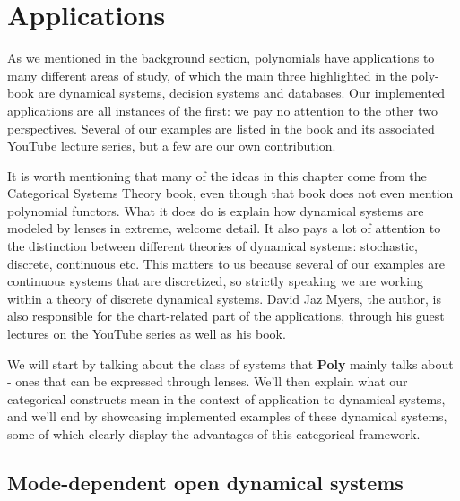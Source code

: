 \chapter{Applications}
\label{chapter:application}
As we mentioned in the background section, polynomials have applications to many different areas of study, of which the main three highlighted in the poly-book are dynamical systems, decision systems and databases. Our implemented applications are all instances of the first: we pay no attention to the other two perspectives. Several of our examples are listed in the book and its associated YouTube lecture series, but a few are our own contribution.

It is worth mentioning that many of the ideas in this chapter come from the Categorical Systems Theory book, even though that book does not even mention polynomial functors. What it does do is explain how dynamical systems are modeled by lenses in extreme, welcome detail. It also pays a lot of attention to the distinction between different theories of dynamical systems: stochastic, discrete, continuous etc. This matters to us because several of our examples are continuous systems that are discretized, so strictly speaking we are working within a theory of discrete dynamical systems. David Jaz Myers, the author, is also responsible for the chart-related part of the applications, through his guest lectures on the YouTube series as well as his book.

We will start by talking about the class of systems that \textbf{Poly} mainly talks about - ones that can be expressed through lenses. We'll then explain what our categorical constructs mean in the context of application to dynamical systems, and we'll end by showcasing implemented examples of these dynamical systems, some of which clearly display the advantages of this categorical framework.

\newpage

\section{Mode-dependent open dynamical systems}

